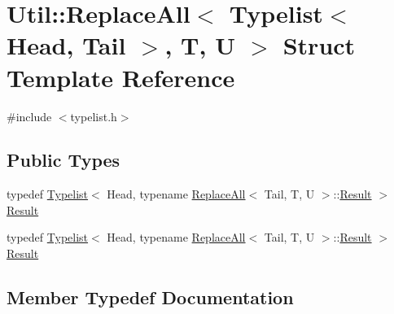 \hypertarget{structUtil_1_1TL_1_1ReplaceAll_3_01Typelist_3_01Head_00_01Tail_01_4_00_01T_00_01U_01_4}{}\section{Util\+:\+:Replace\+All$<$ Typelist$<$ Head, Tail $>$, T, U $>$ Struct Template Reference}
\label{structUtil_1_1TL_1_1ReplaceAll_3_01Typelist_3_01Head_00_01Tail_01_4_00_01T_00_01U_01_4}


{\ttfamily \#include $<$typelist.\+h$>$}

\subsection*{Public Types}
\begin{DoxyCompactItemize}
\item 
typedef \mbox{\hyperlink{structUtil_1_1Typelist}{Typelist}}$<$ Head, typename \mbox{\hyperlink{structUtil_1_1TL_1_1ReplaceAll}{Replace\+All}}$<$ Tail, T, U $>$\+::\mbox{\hyperlink{structUtil_1_1TL_1_1ReplaceAll_3_01Typelist_3_01Head_00_01Tail_01_4_00_01T_00_01U_01_4_ae088fac6604aa56701fce6cb8b402178}{Result}} $>$ \mbox{\hyperlink{structUtil_1_1TL_1_1ReplaceAll_3_01Typelist_3_01Head_00_01Tail_01_4_00_01T_00_01U_01_4_ae088fac6604aa56701fce6cb8b402178}{Result}}
\item 
typedef \mbox{\hyperlink{structUtil_1_1Typelist}{Typelist}}$<$ Head, typename \mbox{\hyperlink{structUtil_1_1TL_1_1ReplaceAll}{Replace\+All}}$<$ Tail, T, U $>$\+::\mbox{\hyperlink{structUtil_1_1TL_1_1ReplaceAll_3_01Typelist_3_01Head_00_01Tail_01_4_00_01T_00_01U_01_4_ae088fac6604aa56701fce6cb8b402178}{Result}} $>$ \mbox{\hyperlink{structUtil_1_1TL_1_1ReplaceAll_3_01Typelist_3_01Head_00_01Tail_01_4_00_01T_00_01U_01_4_ae088fac6604aa56701fce6cb8b402178}{Result}}
\end{DoxyCompactItemize}


\subsection{Member Typedef Documentation}
\mbox{\label{structUtil_1_1TL_1_1ReplaceAll_3_01Typelist_3_01Head_00_01Tail_01_4_00_01T_00_01U_01_4_ae088fac6604aa56701fce6cb8b402178}} 
